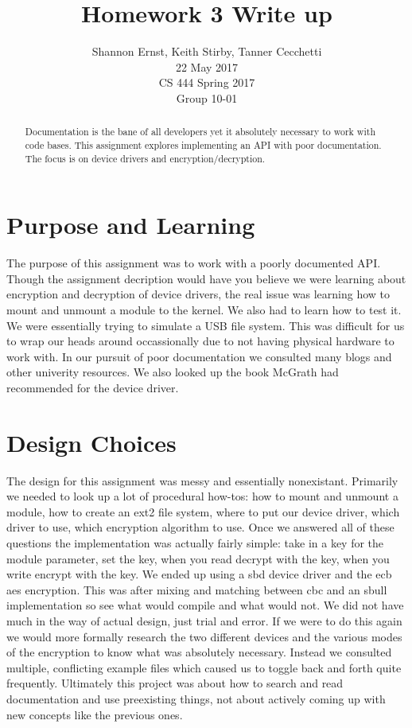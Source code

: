 \documentclass[letterpaper,10pt,serif,draftclsnofoot,onecolumn,compsoc,titlepage]{IEEEtran}
\title{Homework 3 Write up}
\author{Shannon Ernst, Keith Stirby, Tanner Cecchetti\\ 22 May 2017 \\ CS 444 Spring 2017 \\ Group 10-01}
\begin{document}
\maketitle
\begin{abstract}
Documentation is the bane of all developers yet it absolutely necessary to work with 
code bases. This assignment explores implementing an API with poor documentation. 
The focus is on device drivers and encryption/decryption.
\end{abstract}
\newpage
\tableofcontents
\newpage
\section{Purpose and Learning}
The purpose of this assignment was to work with a poorly documented API. 
Though the assignment decription would have you believe we were learning 
about encryption and decryption of device drivers, the real issue was learning 
how to mount and unmount a module to the kernel. We also had to learn how to test 
it. We were essentially trying to simulate a USB file system. This was difficult 
for us to wrap our heads around occassionally due to not having physical hardware 
to work with. In our pursuit of poor documentation we consulted many blogs and other
univerity resources. We also looked up the book McGrath had recommended for the device 
driver.
\section{Design Choices}
The design for this assignment was messy and essentially nonexistant. Primarily 
we needed to look up a lot of procedural how-tos: how to mount and unmount a module, 
how to create an ext2 file system, where to put our device driver, which driver to 
use, which encryption algorithm to use. Once we answered all of these questions the 
implementation was actually fairly simple: take in a key for the module parameter, 
set the key, when you read decrypt with the key, when you write encrypt with the key. 
We ended up using a sbd device driver and the ecb aes encryption. This was after mixing 
and matching between cbc and an sbull implementation so see what would compile and what 
would not. We did not have much in the way of actual design, just trial and error. If we 
were to do this again we would more formally research the two different devices and the 
various modes of the encryption to know what was absolutely necessary. Instead we consulted 
multiple, conflicting example files which caused us to toggle back and forth quite frequently. 
Ultimately this project was about how to search and read documentation and use preexisting things,
not about actively coming up with new concepts like the previous ones. 
\end{document}
